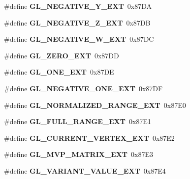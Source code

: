 \begin{DoxyCompactItemize}
\item 
\#define {\bfseries G\+L\+\_\+\+N\+E\+G\+A\+T\+I\+V\+E\+\_\+\+Y\+\_\+\+E\+X\+T}~0x87\+D\+A\label{_s_d_l__opengl_8h_a0df77eca4c4d9169b70e1002e5493db1}

\item 
\#define {\bfseries G\+L\+\_\+\+N\+E\+G\+A\+T\+I\+V\+E\+\_\+\+Z\+\_\+\+E\+X\+T}~0x87\+D\+B\label{_s_d_l__opengl_8h_a7e9f4906c829b46161f9d2f4a4afa457}

\item 
\#define {\bfseries G\+L\+\_\+\+N\+E\+G\+A\+T\+I\+V\+E\+\_\+\+W\+\_\+\+E\+X\+T}~0x87\+D\+C\label{_s_d_l__opengl_8h_a0013018c97b1bd134aa95db8699366c0}

\item 
\#define {\bfseries G\+L\+\_\+\+Z\+E\+R\+O\+\_\+\+E\+X\+T}~0x87\+D\+D\label{_s_d_l__opengl_8h_a67a14850ddc3df36175fa3d3fab66408}

\item 
\#define {\bfseries G\+L\+\_\+\+O\+N\+E\+\_\+\+E\+X\+T}~0x87\+D\+E\label{_s_d_l__opengl_8h_a15863742821a604db79768c476e2abaa}

\item 
\#define {\bfseries G\+L\+\_\+\+N\+E\+G\+A\+T\+I\+V\+E\+\_\+\+O\+N\+E\+\_\+\+E\+X\+T}~0x87\+D\+F\label{_s_d_l__opengl_8h_ad0b88c02bfeeffa7c1809d970e0841b6}

\item 
\#define {\bfseries G\+L\+\_\+\+N\+O\+R\+M\+A\+L\+I\+Z\+E\+D\+\_\+\+R\+A\+N\+G\+E\+\_\+\+E\+X\+T}~0x87\+E0\label{_s_d_l__opengl_8h_ad695b8f36ec789991ae23f00ac595c8b}

\item 
\#define {\bfseries G\+L\+\_\+\+F\+U\+L\+L\+\_\+\+R\+A\+N\+G\+E\+\_\+\+E\+X\+T}~0x87\+E1\label{_s_d_l__opengl_8h_af5f2fa131e97452a04102f90f3d21b77}

\item 
\#define {\bfseries G\+L\+\_\+\+C\+U\+R\+R\+E\+N\+T\+\_\+\+V\+E\+R\+T\+E\+X\+\_\+\+E\+X\+T}~0x87\+E2\label{_s_d_l__opengl_8h_a3d016e00e5d0907c2d5a20e7d4acc712}

\item 
\#define {\bfseries G\+L\+\_\+\+M\+V\+P\+\_\+\+M\+A\+T\+R\+I\+X\+\_\+\+E\+X\+T}~0x87\+E3\label{_s_d_l__opengl_8h_ab0f043774b4910ea290a0ed5b46b61a9}

\item 
\#define {\bfseries G\+L\+\_\+\+V\+A\+R\+I\+A\+N\+T\+\_\+\+V\+A\+L\+U\+E\+\_\+\+E\+X\+T}~0x87\+E4\label{_s_d_l__opengl_8h_a2d0a93cac41e7c5b5f7b42b09cabd7ed}


\end{DoxyCompactItemize}
